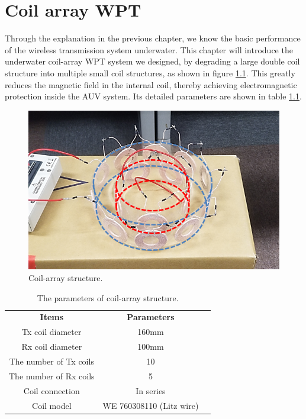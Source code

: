 \chapter{Coil array WPT}
Through the explanation in the previous chapter, we know the basic performance of the wireless transmission system underwater. This chapter will introduce the underwater coil-array WPT system we designed, by degrading a large double coil structure into multiple small coil structures, as shown in figure \ref{fig:3_coil_array_structure}. This greatly reduces the magnetic field in the internal coil, thereby achieving electromagnetic protection inside the AUV system. Its detailed parameters are shown in table \ref{table: coil array parameters}.

\begin{figure}[!b]
    \centering
    \includegraphics[width=0.7\linewidth]{images/3_coil_array_structure.png}
    \caption{Coil-array structure.}
    \label{fig:3_coil_array_structure}
\end{figure}

\begin{table}[!t]
    \centering
    \caption{The parameters of coil-array structure.}
    \begin{tabular}{ c|cc }
        \thickhline
        \textbf{Items}         & \textbf{Parameters}      \\
        \thickhline
        Tx coil diameter       & 160mm                    \\ \hline
        Rx coil diameter       & 100mm                     \\ \hline
        The number of Tx coils & 10                       \\ \hline
        The number of Rx coils & 5                        \\ \hline
        Coil connection        & In series                \\ \hline
        Coil model             & WE 760308110 (Litz wire) \\ \hline
    \end{tabular}
    \label{table: coil array parameters}
\end{table}

